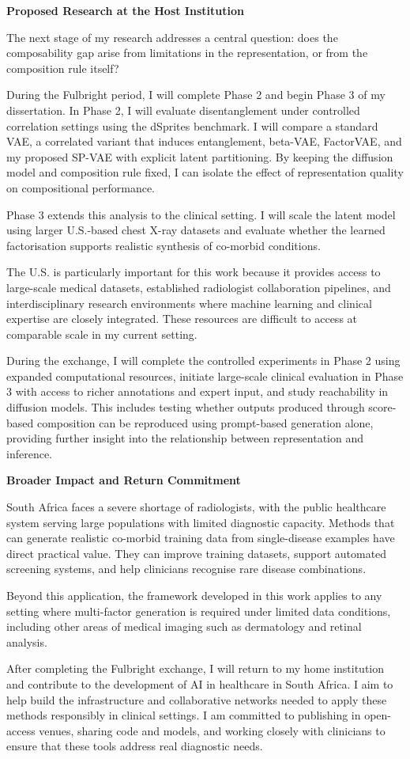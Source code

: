 \documentclass[12pt,a4paper]{article}
\begin{document}
\textbf{Proposed Research at the Host Institution}

The next stage of my research addresses a central question: does the composability gap arise from limitations in the representation, or from the composition rule itself?

During the Fulbright period, I will complete Phase 2 and begin Phase 3 of my dissertation. In Phase 2, I will evaluate disentanglement under controlled correlation settings using the dSprites benchmark. I will compare a standard VAE, a correlated variant that induces entanglement, beta-VAE, FactorVAE, and my proposed SP-VAE with explicit latent partitioning. By keeping the diffusion model and composition rule fixed, I can isolate the effect of representation quality on compositional performance.

Phase 3 extends this analysis to the clinical setting. I will scale the latent model using larger U.S.-based chest X-ray datasets and evaluate whether the learned factorisation supports realistic synthesis of co-morbid conditions.

The U.S. is particularly important for this work because it provides access to large-scale medical datasets, established radiologist collaboration pipelines, and interdisciplinary research environments where machine learning and clinical expertise are closely integrated. These resources are difficult to access at comparable scale in my current setting.

During the exchange, I will complete the controlled experiments in Phase 2 using expanded computational resources, initiate large-scale clinical evaluation in Phase 3 with access to richer annotations and expert input, and study reachability in diffusion models. This includes testing whether outputs produced through score-based composition can be reproduced using prompt-based generation alone, providing further insight into the relationship between representation and inference.

\textbf{Broader Impact and Return Commitment}

South Africa faces a severe shortage of radiologists, with the public healthcare system serving large populations with limited diagnostic capacity. Methods that can generate realistic co-morbid training data from single-disease examples have direct practical value. They can improve training datasets, support automated screening systems, and help clinicians recognise rare disease combinations.

Beyond this application, the framework developed in this work applies to any setting where multi-factor generation is required under limited data conditions, including other areas of medical imaging such as dermatology and retinal analysis.

After completing the Fulbright exchange, I will return to my home institution and contribute to the development of AI in healthcare in South Africa. I aim to help build the infrastructure and collaborative networks needed to apply these methods responsibly in clinical settings. I am committed to publishing in open-access venues, sharing code and models, and working closely with clinicians to ensure that these tools address real diagnostic needs.
\end{document}
